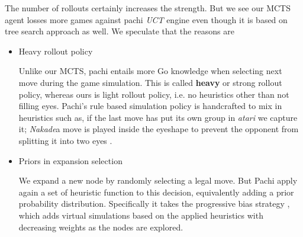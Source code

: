 \documentclass{article}
\begin{document}
The number of rollouts certainly increases the strength. But we see our MCTS agent losses more games against pachi \textit{UCT} engine even though it is based on tree search approach as well. We speculate that the reasons are
\begin{itemize}
  \item
    Heavy rollout policy 

    Unlike our MCTS, pachi entails more Go knowledge when selecting next move during the game simulation. This is called \textbf{heavy} or strong rollout policy, whereas ours is light rollout policy, i.e. no heuristics other than not filling eyes. Pachi's rule based simulation policy is handcrafted to mix in heuristics such as,  if the last move has put its own group in \textit{atari} we capture it; \textit{Nakade}a move is played inside the eyeshape to prevent the opponent from splitting it into two eyes \cite{baudivs2011pachi}.

  \item
    Priors in expansion selection
  
    We expand a new node by randomly selecting a legal move. But Pachi apply again a set of heuristic function to this decision, equivalently adding a prior probability distribution.  Specifically it takes the progressive bias strategy \cite{gelly2007combining}, which adds virtual simulations based on the applied heuristics with decreasing weights as the nodes are explored.

\end{itemize}
\end{document}
